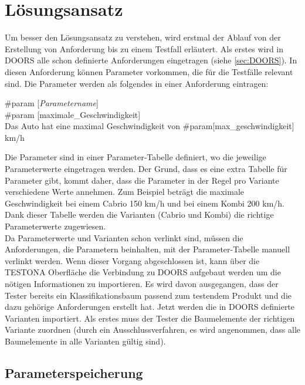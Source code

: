 \chapter{Lösungsansatz}\label{chp:loesungsansatz}

Um besser den Lösungsansatz zu verstehen, wird erstmal der Ablauf von der Erstellung von Anforderung bis zu einem Testfall erläutert. Als erstes wird in DOORS alle schon definierte Anforderungen eingetragen (siehe \ref{sec:DOORS}). In diesen Anforderung können Parameter vorkommen, die für die Testfälle relevant sind. Die Parameter werden als folgendes in einer Anforderung eintragen:\\

\begin{center}
\#param [\textit{Parametername}]\\
\#param [maximale\_Geschwindigkeit]\\
Das Auto hat eine maximal Geschwindigkeit von \#param[max\_geschwindigkeit] km/h
\end{center}

Die Parameter sind in einer Parameter-Tabelle definiert, wo die jeweilige Parameterwerte eingetragen werden. Der Grund, dass es eine extra Tabelle für Parameter gibt, kommt daher, dass die Parameter in der Regel pro Variante verschiedene Werte annehmen. Zum Beispiel beträgt die maximale Geschwindigkeit bei einem Cabrio 150 km/h  und bei einem Kombi 200 km/h. Dank dieser Tabelle werden die Varianten (Cabrio und Kombi) die richtige Parameterwerte zugewiesen.\\

Da Parameterwerte und Varianten schon verlinkt sind, müssen die Anforderungen, die Parametern beinhalten, mit der Parameter-Tabelle manuell verlinkt werden. Wenn dieser Vorgang abgeschlossen ist, kann über die TESTONA Oberfläche die Verbindung zu DOORS aufgebaut werden um die nötigen Informationen zu importieren. Es wird davon ausgegangen, dass der Tester bereits ein Klassifikationsbaum passend zum testendem Produkt und die dazu gehörige Anforderungen erstellt hat. Jetzt werden die in DOORS definierte Varianten importiert. Als erstes muss der Tester die Baumelemente der richtigen Variante zuordnen (durch ein Ausschlussverfahren, es wird angenommen, dass alle Baumelemente in alle Varianten gültig sind). 


\newpage
\section{Parameterspeicherung}
